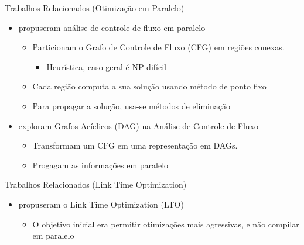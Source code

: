 \begin{frame}{Trabalhos Relacionados (Otimização em Paralelo)}

    \begin{itemize}
        \item \cite{Lee1994} propuseram análise de controle de fluxo em paralelo
            \begin{itemize}
                \item Particionam o Grafo de Controle de Fluxo (CFG) em regiões conexas.
                 \begin{itemize}
                    \item Heurística, caso geral é NP-difícil
                 \end{itemize}
                \item Cada região computa a sua solução usando método de ponto fixo
                \item Para propagar a solução, usa-se métodos de eliminação
            \end{itemize}
        \item \cite{kramer1994combining} exploram Grafos Acíclicos (DAG) na Análise de Controle de Fluxo
            \begin{itemize}
                \item Transformam um CFG em uma representação em DAGs.
                \item Progagam as informações em paralelo
            \end{itemize}
    \end{itemize}
\end{frame}

\begin{frame}{Trabalhos Relacionados (Link Time Optimization)}

    \begin{itemize}
        \item \cite{whoprgoogle} propuseram o Link Time Optimization (LTO)
            \begin{itemize}
                \item O objetivo inicial era permitir otimizações mais agressivas, e não compilar em paralelo
            \end{itemize}
    \end{itemize}
\end{frame}

